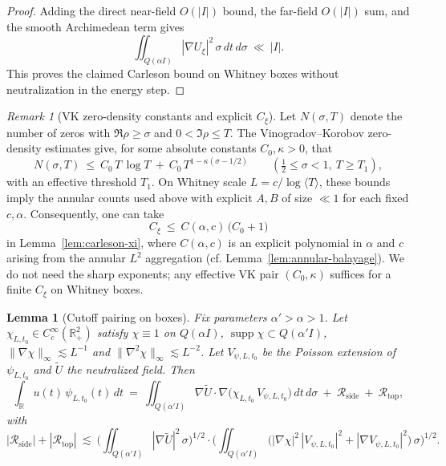 \documentclass[11pt]{article}
\newtheorem{lemma}[theorem]{Lemma}
\theoremstyle{definition}
\theoremstyle{remark}
\newtheorem{remark}[theorem]{Remark}
\theoremstyle{definition}
\newcommand{\R}{\mathbb{R}}
\begin{document}
\begin{proof}
Adding the direct near-field $O(|I|)$ bound, the far-field $O(|I|)$ sum, and the smooth Archimedean term gives
\[
 \iint_{Q(\alpha I)} |\nabla U_\xi|^2\,\sigma\,dt\,d\sigma\ \ll\ |I|.
\]
This proves the claimed Carleson bound on Whitney boxes without neutralization in the energy step.
\end{proof}
\begin{remark}[VK zero-density constants and explicit $C_\xi$]
Let $N(\sigma,T)$ denote the number of zeros with $\Re\rho\ge \sigma$ and $0<\Im\rho\le T$. The Vinogradov–Korobov zero-density estimates give, for some absolute constants $C_0,\kappa>0$, that
\[
  N(\sigma,T)\ \le\ C_0\,T\,\log T\ +\ C_0\,T^{1-\kappa(\sigma-1/2)}\qquad (\tfrac12\le \sigma<1,\ T\ge T_1),
\]
with an effective threshold $T_1$. On Whitney scale $L=c/\log\langle T\rangle$, these bounds imply the annular counts used above with explicit $A,B$ of size $\ll 1$ for each fixed $c,\alpha$. Consequently, one can take
\[
  C_\xi\ \le\ C(\alpha,c)\,\big(C_0+1\big)
\]
in Lemma~\ref{lem:carleson-xi}, where $C(\alpha,c)$ is an explicit polynomial in $\alpha$ and $c$ arising from the annular $L^2$ aggregation (cf. Lemma~\ref{lem:annular-balayage}). We do not need the sharp exponents; any effective VK pair $(C_0,\kappa)$ suffices for a finite $C_\xi$ on Whitney boxes.
\end{remark}
\begin{lemma}[Cutoff pairing on boxes]\label{lem:cutoff-pairing}
Fix parameters $\alpha'>\alpha>1$. Let $\chi_{L,t_0}\in C_c^\infty(\R^2_+)$ satisfy $\chi\equiv1$ on $Q(\alpha I)$, $\operatorname{supp}\chi\subset Q(\alpha'I)$, $\|\nabla\chi\|_\infty\lesssim L^{-1}$ and $\|\nabla^2\chi\|_\infty\lesssim L^{-2}$. Let $V_{\psi,L,t_0}$ be the Poisson extension of $\psi_{L,t_0}$ and $\widetilde U$ the neutralized field. Then
\[
 \int_{\R} u(t)\,\psi_{L,t_0}(t)\,dt
 \ =\ \iint_{Q(\alpha'I)} \nabla \widetilde U\cdot \nabla\big(\chi_{L,t_0}\, V_{\psi,L,t_0}\big)\,dt\,d\sigma\ +\ \mathcal R_{\mathrm{side}}\ +\ \mathcal R_{\mathrm{top}},
\]
with
\[
 |\mathcal R_{\mathrm{side}}|+|\mathcal R_{\mathrm{top}}|
 \ \lesssim\ \Big(\iint_{Q(\alpha'I)} |\nabla \widetilde U|^2\,\sigma\Big)^{1/2}
               \cdot \Big(\iint_{Q(\alpha'I)} \big(|\nabla\chi|^2\,|V_{\psi,L,t_0}|^2+|\nabla V_{\psi,L,t_0}|^2\big)\,\sigma\Big)^{1/2}.
\]
\end{lemma}
\end{document}
